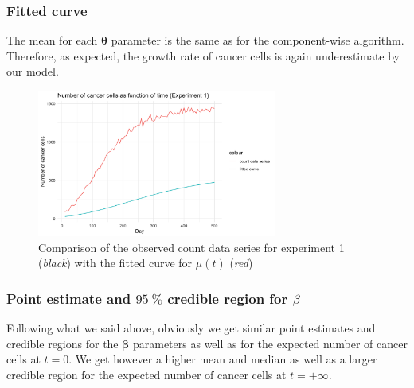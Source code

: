 \subsubsection*{Fitted curve}

The mean for each $\bm{\theta}$ parameter is the same as for the component-wise algorithm. Therefore, as expected, the growth rate of cancer cells is again underestimate by our model.

\begin{figure}[H]
	\centering
	\includegraphics[width=0.7\textwidth]{figures/metropolis_vw/metropolis_vw_fitted_curve.png}
	\caption{Comparison of the observed count data series for experiment 1 (\textit{black}) with the fitted curve for $\mu(t)$ (\textit{red})}
	\label{fig:metropolis-vw-fitted-curve}
\end{figure}

\subsubsection*{Point estimate and $\SI{95}{\percent}$ credible region for $\beta$}

Following what we said above, obviously we get similar point estimates and credible regions for the $\bm{\beta}$ parameters as well as for the expected number of cancer cells at $t = 0$. We get however a higher mean and median as well as a larger credible region for the expected number of cancer cells at $t = +\infty$.

